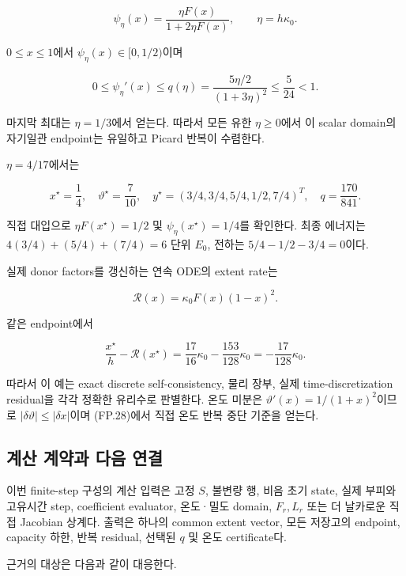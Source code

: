\documentclass[11pt,a4paper]{article}
\begin{document}
\[
\psi_\eta(x)=\frac{\eta F(x)}{1+2\eta F(x)},
\qquad \eta=h\kappa_0 .
\tag{FP.48}
\]

\(0\le x\le1\)에서 \(\psi_\eta(x)\in[0,1/2)\)이며

\[
0\le\psi_\eta'(x)
\le
q(\eta)=\frac{5\eta/2}{(1+3\eta)^2}
\le \frac5{24}<1.
\tag{FP.49}
\]

마지막 최대는 \(\eta=1/3\)에서 얻는다. 따라서 모든 유한 \(\eta\ge0\)에서 이 scalar domain의 자기일관 endpoint는 유일하고 Picard 반복이 수렴한다.

\(\eta=4/17\)에서는

\[
\boxed{
x^\star=\frac14,\quad
\vartheta^\star=\frac7{10},\quad
y^\star=(3/4,3/4,5/4,1/2,7/4)^T,\quad
q=\frac{170}{841}.
}
\tag{FP.50}
\]

직접 대입으로 \(\eta F(x^\star)=1/2\) 및 \(\psi_\eta(x^\star)=1/4\)를 확인한다. 최종 에너지는 \(4(3/4)+(5/4)+(7/4)=6\) 단위 \(E_0\), 전하는 \(5/4-1/2-3/4=0\)이다.

실제 donor factors를 갱신하는 연속 ODE의 extent rate는

\[
\mathcal R(x)=\kappa_0F(x)(1-x)^2 .
\]

같은 endpoint에서

\[
\boxed{
\frac{x^\star}{h}-\mathcal R(x^\star)
=
\frac{17}{16}\kappa_0-\frac{153}{128}\kappa_0
=
-\frac{17}{128}\kappa_0.
}
\tag{FP.51}
\]

따라서 이 예는 exact discrete self-consistency, 물리 장부, 실제 time-discretization residual을 각각 정확한 유리수로 판별한다. 온도 미분은 \(\vartheta'(x)=1/(1+x)^2\)이므로 \(|\delta\vartheta|\le|\delta x|\)이며 (FP.28)에서 직접 온도 반복 중단 기준을 얻는다.

\hypertarget{uxacc4uxc0b0-uxacc4uxc57duxacfc-uxb2e4uxc74c-uxc5f0uxacb0}{%
\subsection{계산 계약과 다음 연결}\label{uxacc4uxc0b0-uxacc4uxc57duxacfc-uxb2e4uxc74c-uxc5f0uxacb0}}

이번 finite-step 구성의 계산 입력은 고정 \(S\), 불변량 행, 비음 초기 state, 실제 부피와 고유시간 step, coefficient evaluator, 온도·밀도 domain, \(F_r,L_r\) 또는 더 날카로운 직접 Jacobian 상계다. 출력은 하나의 common extent vector, 모든 저장고의 endpoint, capacity 하한, 반복 residual, 선택된 \(q\) 및 온도 certificate다.

근거의 대상은 다음과 같이 대응한다.
\end{document}
